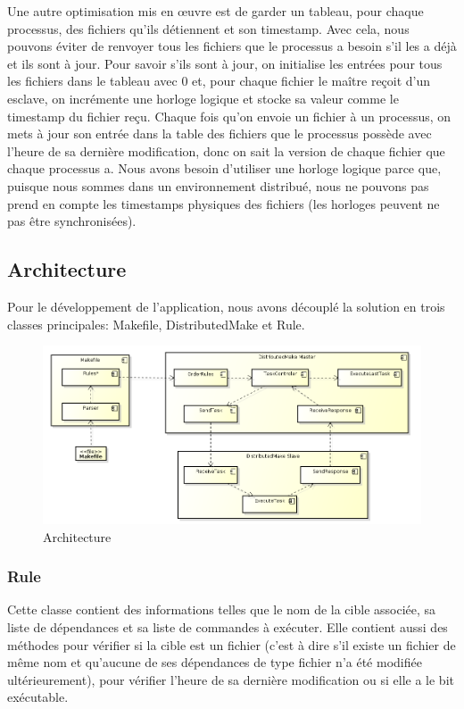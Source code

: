 \documentclass[a4paper,12pt,twoside]{article}
\begin{document}
Une autre optimisation mis en œuvre est de garder un tableau, pour chaque processus, des fichiers qu'ils détiennent et son timestamp. Avec cela, nous pouvons éviter de renvoyer tous les fichiers que le processus a besoin s'il les a déjà et ils sont à jour. Pour savoir s'ils sont à jour, on initialise les entrées pour tous les fichiers dans le tableau avec 0 et, pour chaque fichier le maître reçoit d'un esclave, on incrémente une horloge logique et stocke sa valeur comme le timestamp du fichier reçu. Chaque fois qu'on envoie un fichier à un processus, on mets à jour son entrée dans la table des fichiers que le processus possède avec l'heure de sa dernière modification, donc on sait la version de chaque fichier que chaque processus a. Nous avons besoin d'utiliser une horloge logique parce que, puisque nous sommes dans un environnement distribué, nous ne pouvons pas prend en compte les timestamps physiques des fichiers (les horloges peuvent ne pas être synchronisées).

\subsection{Architecture}

Pour le développement de l'application, nous avons découplé la solution en
trois classes principales: Makefile, DistributedMake et Rule.

\begin{figure}[H]
  \centering
  \includegraphics[scale=0.4]{schema.png}
  \caption{Architecture}
  \label{fig:architecture}
\end{figure}

\subsubsection{Rule}

Cette classe contient des informations telles que le nom de la cible
associée, sa liste de dépendances et sa liste de commandes à
exécuter. Elle contient aussi des méthodes pour vérifier si la cible
est un fichier (c'est à dire s'il existe un fichier de même nom et
qu'aucune de ses dépendances de type fichier n'a été modifiée
ultérieurement), pour vérifier l'heure de sa dernière modification ou
si elle a le bit exécutable.
\end{document}
